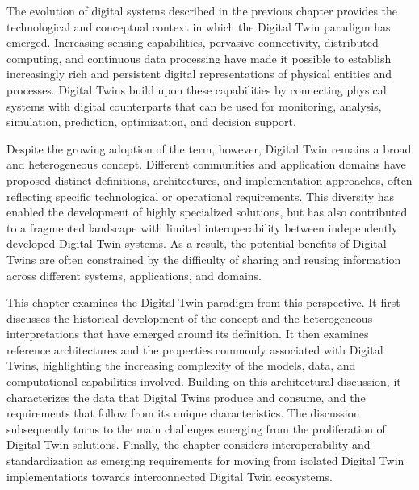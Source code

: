 The evolution of digital systems described in the previous chapter provides the technological and conceptual context in which the Digital Twin paradigm has emerged. Increasing sensing capabilities, pervasive connectivity, distributed computing, and continuous data processing have made it possible to establish increasingly rich and persistent digital representations of physical entities and processes. Digital Twins build upon these capabilities by connecting physical systems with digital counterparts that can be used for monitoring, analysis, simulation, prediction, optimization, and decision support.

Despite the growing adoption of the term, however, Digital Twin remains a broad and heterogeneous concept. Different communities and application domains have proposed distinct definitions, architectures, and implementation approaches, often reflecting specific technological or operational requirements. This diversity has enabled the development of highly specialized solutions, but has also contributed to a fragmented landscape with limited interoperability between independently developed Digital Twin systems. As a result, the potential benefits of Digital Twins are often constrained by the difficulty of sharing and reusing information across different systems, applications, and domains.

This chapter examines the Digital Twin paradigm from this perspective. It first discusses the historical development of the concept and the heterogeneous interpretations that have emerged around its definition. It then examines reference architectures and the properties commonly associated with Digital Twins, highlighting the increasing complexity of the models, data, and computational capabilities involved. Building on this architectural discussion, it characterizes the data that Digital Twins produce and consume, and the requirements that follow from its unique characteristics. The discussion subsequently turns to the main challenges emerging from the proliferation of Digital Twin solutions. Finally, the chapter considers interoperability and standardization as emerging requirements for moving from isolated Digital Twin implementations towards interconnected Digital Twin ecosystems.


